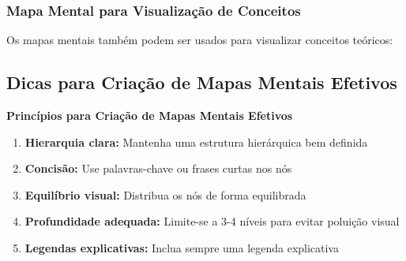 \subsubsection{Mapa Mental para Visualização de Conceitos}

Os mapas mentais também podem ser usados para visualizar conceitos teóricos:

\begin{docstructmap}
    
    
    
    
    
\end{docstructmap}


\subsection{Dicas para Criação de Mapas Mentais Efetivos}

\begin{rule}
\textbf{Princípios para Criação de Mapas Mentais Efetivos}

\begin{enumerate}
    \item \textbf{Hierarquia clara:} Mantenha uma estrutura hierárquica bem definida
    \item \textbf{Concisão:} Use palavras-chave ou frases curtas nos nós
    \item \textbf{Equilíbrio visual:} Distribua os nós de forma equilibrada
    \item \textbf{Profundidade adequada:} Limite-se a 3-4 níveis para evitar poluição visual
    \item \textbf{Legendas explicativas:} Inclua sempre uma legenda explicativa
\end{enumerate}
\end{rule}

